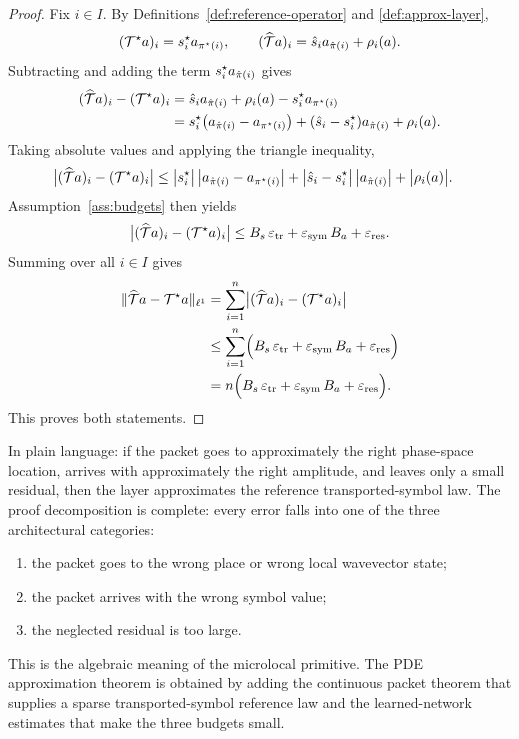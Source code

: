 \begin{proof}
Fix $i\in I$. By Definitions~\ref{def:reference-operator} and \ref{def:approx-layer},
\[
(\mathcal T^\star a)_i = s^\star_i a_{\pi^\star(i)},
\qquad
(\widehat{\mathcal T}a)_i = \hat s_i a_{\hat\pi(i)} + \rho_i(a).
\]
Subtracting and adding the term $s^\star_i a_{\hat\pi(i)}$ gives
\begin{align*}
(\widehat{\mathcal T}a)_i - (\mathcal T^\star a)_i
&=
\hat s_i a_{\hat\pi(i)} + \rho_i(a) - s^\star_i a_{\pi^\star(i)}\\
&=
s^\star_i\bigl(a_{\hat\pi(i)}-a_{\pi^\star(i)}\bigr)
 + (\hat s_i-s^\star_i)a_{\hat\pi(i)}
 + \rho_i(a).
\end{align*}
Taking absolute values and applying the triangle inequality,
\begin{align*}
\bigl|(\widehat{\mathcal T}a)_i - (\mathcal T^\star a)_i\bigr|
&\le
\bigl|s^\star_i\bigr|\,\bigl|a_{\hat\pi(i)}-a_{\pi^\star(i)}\bigr|
 + \bigl|\hat s_i-s^\star_i\bigr|\,\bigl|a_{\hat\pi(i)}\bigr|
 + \bigl|\rho_i(a)\bigr|.
\end{align*}
Assumption~\ref{ass:budgets} then yields
\[
\bigl|(\widehat{\mathcal T}a)_i - (\mathcal T^\star a)_i\bigr|
\le
B_s\,\varepsilon_{\mathrm{tr}} + \varepsilon_{\mathrm{sym}}\,B_a + \varepsilon_{\mathrm{res}}.
\]
Summing over all $i\in I$ gives
\begin{align*}
\|\widehat{\mathcal T}a - \mathcal T^\star a\|_{\ell^1}
&=
\sum_{i=1}^n \bigl|(\widehat{\mathcal T}a)_i - (\mathcal T^\star a)_i\bigr|\\
&\le
\sum_{i=1}^n \Bigl(B_s\,\varepsilon_{\mathrm{tr}} + \varepsilon_{\mathrm{sym}}\,B_a + \varepsilon_{\mathrm{res}}\Bigr)\\
&=
n\Bigl(B_s\,\varepsilon_{\mathrm{tr}} + \varepsilon_{\mathrm{sym}}\,B_a + \varepsilon_{\mathrm{res}}\Bigr).
\end{align*}
This proves both statements.
\end{proof}

In plain language: if the packet goes to approximately the right phase-space location, arrives with approximately the right amplitude, and leaves only a small residual, then the layer approximates the reference transported-symbol law. The proof decomposition is complete: every error falls into one of the three architectural categories:
\begin{enumerate}
\item the packet goes to the wrong place or wrong local wavevector state;
\item the packet arrives with the wrong symbol value;
\item the neglected residual is too large.
\end{enumerate}
This is the algebraic meaning of the microlocal primitive. The PDE approximation theorem is obtained by adding the continuous packet theorem that supplies a sparse transported-symbol reference law and the learned-network estimates that make the three budgets small.

